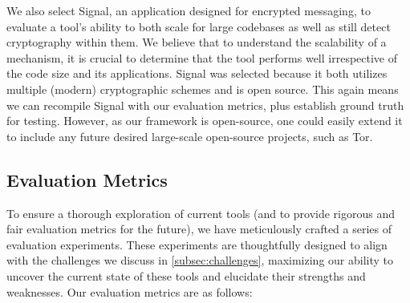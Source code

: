  We also select Signal, an application designed for encrypted messaging, to evaluate a tool's ability to both scale for large codebases as well as still detect cryptography within them.  We believe that to understand the scalability of a mechanism, it is crucial to determine that the tool performs well irrespective of the code size and its applications.
Signal was selected because it both utilizes multiple (modern) cryptographic schemes and is open source.  This again means we can recompile Signal with our evaluation metrics, plus establish ground truth for testing. However, as our framework is open-source, one could easily extend it to include any future desired large-scale open-source projects, such as Tor.

\subsection{Evaluation Metrics}
\label{subsec:cryptobinary-metrics}
To ensure a thorough exploration of current tools (and to provide rigorous and fair evaluation metrics for the future), we have meticulously crafted a series of evaluation experiments. These experiments are thoughtfully designed to align with the challenges we discuss in \autoref{subsec:challenges}, maximizing our ability to uncover the current state of these tools and elucidate their strengths and weaknesses.  Our evaluation metrics are as follows:
 
